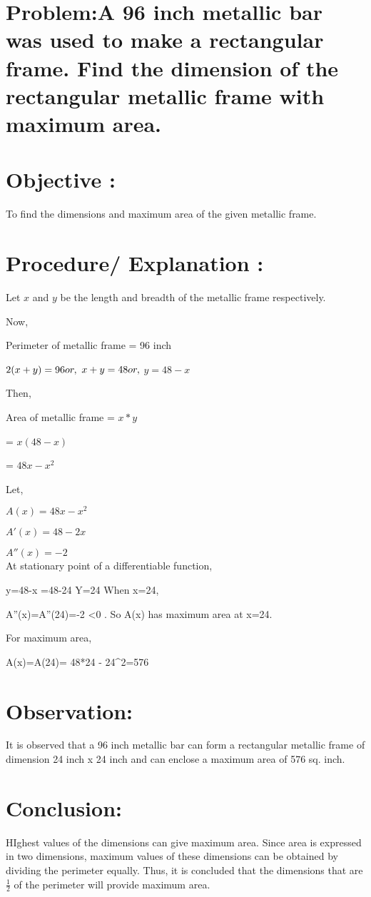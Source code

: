 \documentclass{article}
\begin{document}
\section*{\textbf{Problem:}A 96 inch metallic bar was used to make a rectangular frame. Find the dimension of the rectangular metallic frame with maximum area.}
    
\section{Objective :}
 To find the dimensions and maximum area of the given metallic frame.
    
\section{Procedure/ Explanation :}
\hspace{1em}Let $x$ and $y$ be the length and breadth of the metallic frame respectively.

Now,

Perimeter of metallic frame = 96 inch


$2(x+y)=96 \\ or,$   $x+y=48 \\ or,$   $y=48-x$

Then,


Area of metallic frame = $x*y$

\hspace{10em}= $x(48-x)$

\hspace{10em}= $48x-x^2$

           
Let,


$A(x)=48x-x^2$


$A'(x)=48-2x$


$A''(x)=-2$\\


At stationary point of a differentiable function,


y=48-x
 =48-24
Y=24
When x=24,

A''(x)=A''(24)=-2 {\textless}0 . So A(x) has maximum area at x=24.

For maximum area,

A(x)=A(24)= 48*24 - 24{\textasciicircum}2=576
    
\section{Observation:}
It is observed that a 96 inch metallic bar can form a rectangular metallic frame of dimension 24 inch x 24 inch and can enclose a maximum area of 576 sq. inch.
    
\section{Conclusion:}
HIghest values of the dimensions can give maximum area. Since area is expressed in two dimensions, maximum values of these dimensions can be obtained by dividing the perimeter equally. Thus, it is concluded that the dimensions that are \ensuremath{\frac12}  of the perimeter will provide maximum area.
    
\end{document}
